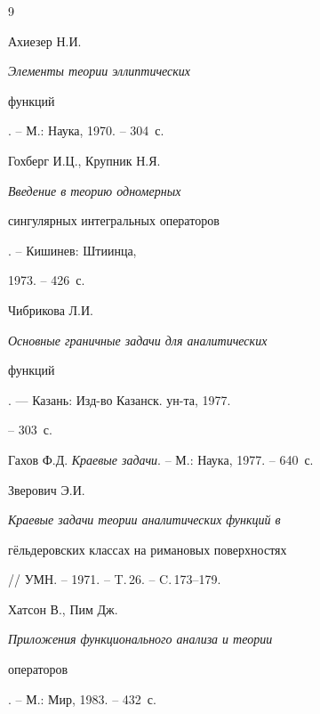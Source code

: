\begin{thebibliography}{9}







Ахиезер Н.И. {\em Элементы теории эллиптических


функций}. -- М.: Наука, 1970. -- 304~с.




Гохберг И.Ц., Крупник Н.Я. {\em Введение в теорию одномерных


сингулярных интегральных операторов}. -- Кишинев: Штиинца,


1973. -- 426~с.




Чибрикова Л.И. {\em Основные граничные задачи для аналитических


функций}. --- Казань: Изд-во Казанск. ун-та, 1977.


-- 303~с.




Гахов Ф.Д. {\em Краевые задачи}. -- М.: Наука, 1977. -- 640~с.




Зверович Э.И. {\em Краевые задачи теории аналитических функций в


г\"ельдеровских классах на римановых поверхностях}


// УМН. -- 1971. -- T.\,26. -- C.\,173--179.




Хатсон В., Пим Дж. {\em Приложения функционального анализа и теории


операторов}. -- М.: Мир, 1983. -- 432~с.





\end{thebibliography}





\vskip 2cm












\label{end}











